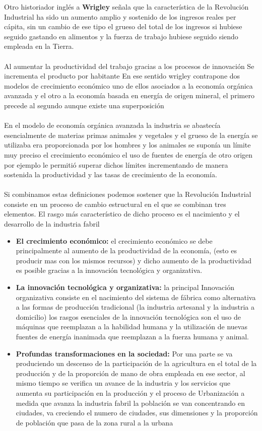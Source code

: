 \documentclass[12pt]{book}++
\begin{document}
Otro historiador inglés a \textbf{Wrigley} señala que la característica de la Revolución Industrial ha sido un aumento amplio y sostenido de los ingresos reales per cápita, sin un cambio de ese tipo el grueso del total de los ingresos si hubiese seguido gastando en alimentos y la fuerza de trabajo hubiese seguido siendo empleada en la Tierra.
\\
\\
Al aumentar la productividad del trabajo gracias a los procesos de innovación Se incrementa el producto por habitante En ese sentido wrigley contrapone dos modelos de crecimiento económico uno de ellos asociados a la economía orgánica avanzada y el otro a la economía basada en energía de origen mineral, el primero precede al segundo aunque existe una superposición 
\\
\\
En el modelo de economía orgánica avanzada la industria se abastecía esencialmente de materias primas animales y vegetales y el grueso de la energía se utilizaba era proporcionada por los hombres y los animales se suponía un límite muy preciso el crecimiento económico el uso de fuentes de energía de otro origen por ejemplo le permitió superar dichos límites incrementando de manera sostenida la productividad y las tasas de crecimiento de la economía.
\\
\\
Si combinamos estas definiciones podemos sostener que la Revolución Industrial consiste en un proceso de cambio estructural en el que se combinan tres elementos.
El rasgo más característico de dicho proceso es el nacimiento y el desarrollo de la industria fabril 

\begin{itemize}
\item \textbf{El crecimiento económico: }el crecimiento económico se debe principalmente al aumento de la productividad de la economía, (esto es producir mas con los mismos recursos) y dicho aumento de la productividad es posible gracias a la innovación tecnológica y organizativa.
\item \textbf{La innovación tecnológica y organizativa: }la principal Innovación organizativa consiste en el nacimiento del sistema de fábrica como alternativa a las formas de producción tradicional (la industria artesanal y la industria a domicilio) los rasgos esenciales de la innovación tecnológica son el uso de máquinas que reemplazan a la habilidad humana y la utilización de nuevas fuentes de energía inanimada que reemplazan a la fuerza humana y animal.
\item \textbf{Profundas transformaciones en la sociedad: }Por una parte se va produciendo un descenso de la participación de la agricultura en el total de la producción y de la proporción de mano de obra empleada en ese sector, al mismo tiempo se verifica un avance de la industria y los servicios que aumenta su participación en la producci\'on y el proceso de Urbanización a medida que avanza la industria fabril la población se van concentrando en ciudades, va creciendo el numero de ciudades, sus dimensiones y la proporción de población que pasa de la zona rural a la urbana
\end{itemize}
\end{document}

